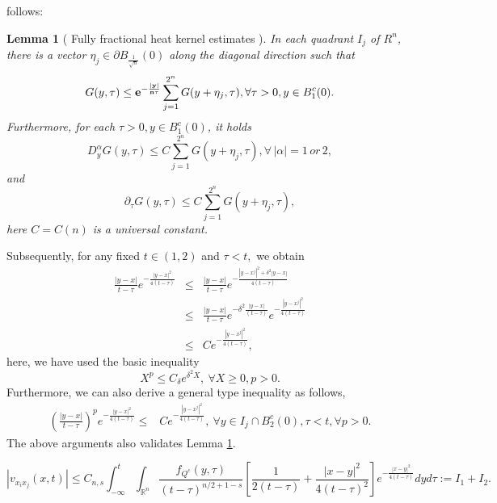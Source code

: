 \documentclass[10pt,a4paper]{amsart}
\newtheorem{mlem}{Lemma}
\begin{document}
follows:
\begin{mlem}[ Fully  fractional heat kernel estimates ]\label{key0} In each quadrant $I_j$ of $R^n$, there is a vector $\eta_j\in\partial B_{\frac{1}{\sqrt{n}}}(0)$ along the diagonal direction such that
\begin{equation}\label{key1} G(y,\tau)\leq {\bf{e^{-\frac{|y|}{n\tau}}}}\sum\limits_{j=1}^{2^n}G(y+{\eta}_j,\tau),  \forall \tau>0, y\in B_1^c(0).\end{equation}
Furthermore,   for each $\tau>0, y\in B_1^c(0)$, it holds
\begin{equation} D_y^\alpha  G(y,\tau)\leq C\sum\limits_{j=1}^{2^n}G(y+{\eta}_j,\tau), \forall \, |\alpha|=1 \, or \, 2,\end{equation}
and
 \begin{equation}  \partial_\tau G(y,\tau)\leq C\sum\limits_{j=1}^{2^n}G(y+{\eta}_j,\tau),\end{equation}
here $C=C(n)$ is a universal constant.
\end{mlem}

Subsequently, for any fixed $t\in (1,2)$ and $\tau<t,$ we obtain
\begin{eqnarray}\label{est key}
\frac{|y-x|}{t-\tau} e^{-\frac{|y-x|^2}{4(t-\tau)}}
&\leq & \frac{|y-x|}{t-\tau} e^{-\frac{|y-x^j|^2+\delta^2|y-x|}{4(t-\tau)}} \nonumber \\
& \leq & \frac{|y-x|}{t-\tau} e^{-\delta^2\frac{|y-x|}{(t-\tau)}}e^{-\frac{|y-x^j|^2}{4(t-\tau)}}\nonumber\\
& \leq & Ce^{-\frac{|y-x^j|^2}{4(t-\tau)}},
\end{eqnarray}
here, we have used the basic inequality
$$X^p\leq  C_\delta e^{\delta^2X}, \ \forall X\geq 0, p>0.$$
 Furthermore, we can also derive a general type inequality as follows,
\begin{eqnarray}\label{key est2}
\left(\frac{|y-x|}{t-\tau}\right)^p e^{-\frac{|y-x|^2}{4(t-\tau)}}
\leq & Ce^{-\frac{|y-x^j|^2}{4(t-\tau)}}, \  \forall y\in I_j\cap B^c_2(0), \tau<t, \forall p>0.
\end{eqnarray}
The above arguments also validates Lemma \ref{key0}.

\begin{equation}\label{est-vij}
|v_{x_{i}x_{j}}(x,t)|\leq C_{n,s}\int_{-\infty}^t \int_{\mathbb{R}^n}  \frac{f_{Q^c}(y,\tau)}{(t-\tau)^{n/2+1-s}} \left[\frac{1}{2(t-\tau)} +\frac{|x-y|^2}{4(t-\tau)^2}\right]e^{-\frac{|x-y|^2}{4(t-\tau)}}dy d\tau:=I_1+I_2.
\end{equation}
\end{document}
